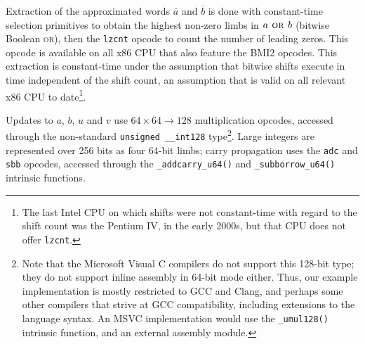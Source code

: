\documentclass{llncs}
\begin{document}
Extraction of the approximated words $\bar a$ and $\bar b$ is done with
constant-time selection primitives to obtain the highest non-zero limbs
in $a \text{\textsc{\ or\ }} b$ (bitwise Boolean \textsc{or}), then
the \verb+lzcnt+ opcode to count the number of leading zeros. This
opcode is available on all x86 CPU that also feature the BMI2 opcodes.
This extraction is constant-time under the assumption that bitwise shifts
execute in time independent of the shift count, an assumption that is
valid on all relevant x86 CPU to date\footnote{The last Intel CPU on
which shifts were not constant-time with regard to the shift count was
the Pentium IV, in the early 2000s, but that CPU does not offer
\texttt{lzcnt}.}.

Updates to $a$, $b$, $u$ and $v$ use $64\times 64\rightarrow 128$
multiplication opcodes, accessed through the non-standard
\verb+unsigned __int128+ type\footnote{Note that the Microsoft Visual C
compilers do not support this 128-bit type; they do not support inline
assembly in 64-bit mode either. Thus, our example implementation is
mostly restricted to GCC and Clang, and perhaps some other compilers
that strive at GCC compatibility, including extensions to the language
syntax. An MSVC implementation would use the \texttt{\_umul128()} intrinsic
function, and an external assembly module.}. Large integers are
represented over 256 bits as four 64-bit limbs; carry propagation uses
the \verb+adc+ and \verb+sbb+ opcodes, accessed through the
\verb+_addcarry_u64()+ and \verb+_subborrow_u64()+ intrinsic functions.
\end{document}
